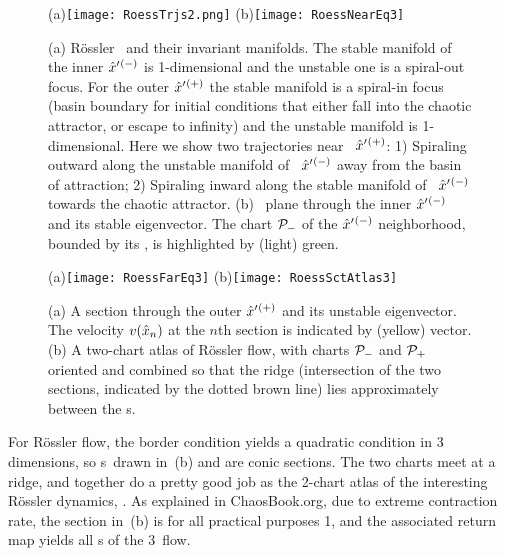 \documentclass[aip,cha,reprint,
secnumarabic,
nofootinbib, tightenlines,
nobibnotes, showkeys, showpacs,
]{revtex4-1}
\begin{document}
\begin{figure}
(a)\texttt{[image: RoessTrjs2.png]}%
(b)\texttt{[image: RoessNearEq3]}
    \caption{
(a)
R\"ossler \eqva\ and their invariant manifolds. The stable manifold of
the inner {\eqv} ${\hat{x}'}{}^{(-)}$  is 1-dimensional and the unstable one
is a spiral-out focus. For the outer {\eqv} ${\hat{x}'}{}^{(+)}$  the stable
manifold is a spiral-in focus (basin boundary for initial conditions that
either fall into the chaotic attractor, or escape to infinity) and the
unstable manifold is 1-dimensional. Here we show two trajectories near \eqva\ ${\hat{x}'}{}^{(+)}$: 1) Spiraling outward along the unstable manifold of \eqva\ ${\hat{x}'}{}^{(-)}$ away from the basin of attraction; 2) Spiraling inward along the stable manifold of \eqva\ ${\hat{x}'}{}^{(-)}$ towards the chaotic attractor.
(b)
\PoincSec\ plane through the inner {\eqv} ${\hat{x}'}{}^{(-)}$ and
its stable eigenvector. The chart ${\cal P}_{-}$ of the ${\hat{x}'}{}^{(-)}$
neighborhood, bounded by its \poincBord, is highlighted by (light) green.
    }
\label{fig:RoessTrjs}
\end{figure}

\begin{figure}%
\begin{center}
(a)\texttt{[image: RoessFarEq3]}%
(b)\texttt{[image: RoessSctAtlas3]}
\end{center}
  \caption[R\"ossler section, outer {\eqv}]{
(a)
  A section through the outer {\eqv} ${\hat{x}'}{}^{(+)}$  and its unstable
  eigenvector. The velocity $v(\hat{x}_n)$ at the $n$th section is
  indicated by (yellow) vector.
(b)
  A two-chart atlas of R\"ossler flow, with charts ${\cal P}_{-}$ and
  ${\cal P}_{+}$ oriented and combined so that the ridge (intersection of
  the two sections, indicated by the dotted brown line) lies
  approximately between the \template s.
  } \label{fig:RoessFarEq}
\end{figure}

For R\"ossler flow, the border condition  yields a
quadratic condition in 3 dimensions, so \poincBord s\ drawn in
\,(b) and  are conic
sections. The two charts meet at a ridge, and together do a pretty good
job as the 2-chart atlas of the interesting R\"ossler dynamics,
. As explained in ChaosBook.org\cite{DasBuch}, due
to extreme contraction rate, the section in \,(b)
is for all practical purposes 1\dmn, and the associated return map yields
all \po s of the 3\dmn\ flow.
\end{document}
